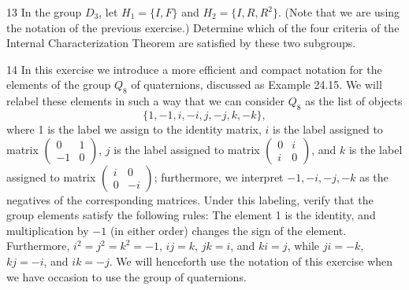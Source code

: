 \begin{problem}{13}
    In the group $D_3$, let $H_1 = \{I, F\}$ and $H_2 = \{I, R, R^2\}$. (Note that we are
    using the notation of the previous exercise.) Determine which of the four criteria of
    the Internal Characterization Theorem are satisfied by these two subgroups.
\end{problem}
\unsolved

\begin{problem}{14}
    In this exercise we introduce a more efficient and compact notation for the elements
    of the group $Q_8$ of quaternions, discussed as Example 24.15. We will relabel these
    elements in such a way that we can consider $Q_8$ as the list of objects
    \[\{1, -1, i, -i, j, -j, k, -k\},\]
    where 1 is the label we assign to the identity matrix, $i$ is the label assigned to
    matrix $\begin{pmatrix} 0 & 1 \\ -1 & 0 \end{pmatrix}$, $j$ is the label assigned to
    matrix $\begin{pmatrix} 0 & i \\ i & 0 \end{pmatrix}$, and $k$ is the label assigned to
    matrix $\begin{pmatrix} i & 0 \\ 0 & -i \end{pmatrix}$; furthermore, we interpret
    $-1, -i, -j, -k$ as the negatives of the corresponding matrices. Under this labeling,
    verify that the group elements satisfy the following rules: The element 1 is the
    identity, and multiplication by $-1$ (in either order) changes the sign of the element.
    Furthermore, $i^2 = j^2 = k^2 = -1$, $ij = k$, $jk = i$, and $ki = j$, while
    $ji = -k$, $kj = -i$, and $ik = -j$. We will henceforth use the notation of this
    exercise when we have occasion to use the group of quaternions.
\end{problem}
\unsolved
